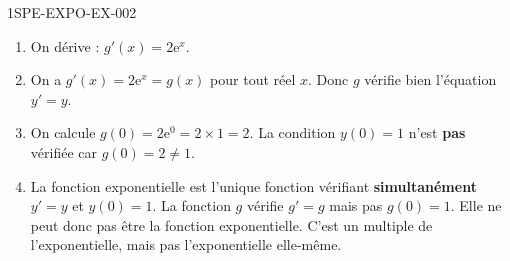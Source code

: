 \begin{corrige}{1SPE-EXPO-EX-002}
\begin{enumerate}
\item On dérive : $g'(x) = 2\mathrm{e}^x$.

\item On a $g'(x) = 2\mathrm{e}^x = g(x)$ pour tout réel $x$.
Donc $g$ vérifie bien l'équation $y' = y$.

\item On calcule $g(0) = 2\mathrm{e}^0 = 2 \times 1 = 2$.
La condition $y(0) = 1$ n'est \textbf{pas} vérifiée car $g(0) = 2
\neq 1$.

\item La fonction exponentielle est l'unique fonction vérifiant \textbf{simultanément} $y' = y$ et $y(0) = 1$. La fonction $g$ vérifie $g' = g$ mais pas $g(0) = 1$. Elle ne peut donc pas être la fonction exponentielle. C'est un multiple de l'exponentielle, mais pas l'exponentielle elle-même.
\end{enumerate}
\end{corrige}
